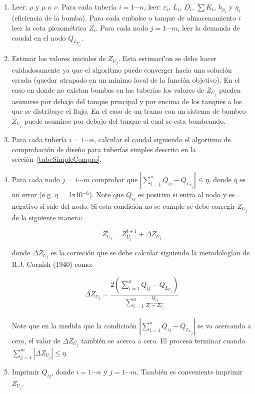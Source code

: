\documentclass[11pt, oneside]{article}
\begin{document}
\begin{enumerate}
\item Leer: $\rho$ y $\mu$ o $\nu$. Para cada tuber\'ia $i=1\cdots n$, leer: $\varepsilon_i$, $L_i$, $D_i$, $\sum K_i$, $h_{p_i}$ y $\eta_i$ (eficiencia de la bomba). Para cada embalse o tanque de almacenamiento $i$ leer la cota piezom\'etrica $Z_i$. Para cada nodo $j=1 \cdots m$, leer la demanda de caudal en el nodo $Q_{L_{U_j}}$.

\item Estimar los valores iniciales de $Z_{U_j}$. Esta estimaci\''on se debe hacer cuidadosamente ya que el algoritmo puede converger hacia una soluci\'on errada (quedar atrapado en un minimo local de la funci\'on objetivo). En el caso en donde no existan bombas en las tuber\'ias los valores de $Z_{U_j}$ pueden asumirse por debajo del tanque principal y por encima de los tanques a los que se distribuye el flujo. En el caso de un tramo con un sistema de bombeo $Z_{U_j}$ puede asumirse por debajo del tanque al cual se esta bombeando. 

\item Para cada tuber\'ia $i=1 \cdots n$, calcular el caudal siguiendo el algoritmo de comprobaci\'on de dise\~no para tuber\'ias simples descrito en la secci\'on~\ref{tubeSimpleCompro}.

\item Para cada nodo $j = 1 \cdots m$ comprobar que $| \sum_{i=1}^{n} Q_{ij} - Q_{L_{U_j}} | \leq \eta$, donde $\eta$ es un error  (e.g. $\eta$ = 1x10$^{-6}$). Note que $Q_{ij}$ es positivo si entra al nodo y es negativo si sale del nodo. Si esta condici\'on no se cumple se debe corregir $Z_{U_j}$ de la siguiente manera:

\begin{equation}
Z_{U_j}^t = Z_{U_j}^{t+1} + \Delta Z_{U_j} 
\label{opne4}
\end{equation}

donde $\Delta Z_{U_j}$ es la correci\'on que se debe calcular siguiendo la metodolog\'ian de R.J. Cornish (1940) como:

\begin{equation}
\Delta Z_{U_j} = \frac{2 \left( \sum_{i=1}^{n} Q_{ij} - Q_{L_{U_j}} \right ) }{\sum_{i=1}^{n} \frac{Q_{ij}}{Z_i - Z_{U_j}}} 
\label{opne5}
\end{equation}

Note que en la medida que la condicio\'on $| \sum_{i=1}^{n} Q_{ij} - Q_{L_{U_j}} |$ se va acercando a cero, el valor de $\Delta Z_{U_j}$ tambi\'en se acerca a cero. El proceso terminar cuando $\sum_{j=1}^m | \Delta Z_{U_j} | \leq \eta $.

\item Imprimir $Q_{ij}$, donde $i= 1 \cdots n$ y $j=1 \cdots m$. Tambi\'en es conveniente imprimir $Z_{U_j}$.

\end{enumerate}
\end{document}
